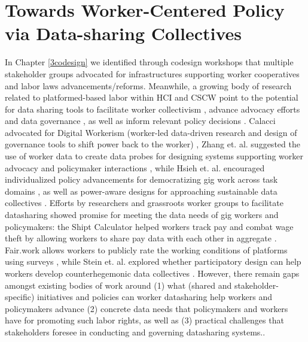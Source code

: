 \chapter{Towards Worker-Centered Policy via Data-sharing Collectives} \label{support}
In Chapter \ref{3codesign} we identified through codesign workshops that multiple stakeholder groups advocated for infrastructures supporting worker cooperatives and labor laws advancements/reforms. 
Meanwhile, a growing body of research related to platformed-based labor within HCI and CSCW point to the potential for data sharing tools to facilitate worker collectivism \cite{end, workshop, chiworkli, uuapp}, advance advocacy efforts \cite{raorideshare, leverage2022gig} and data governance \cite{calacci2023access, zhang24demystifying}, as well as inform relevant policy decisions \cite{zhang2023stakeholder}. 
Calacci advocated for Digital Workerism (worker-led data-driven research and design of governance tools to shift power back to the worker) \cite{end}, Zhang et. al. suggested the use of worker data to create data probes for designing systems supporting worker advocacy \cite{zhang2023stakeholder} and policymaker interactions \cite{policy_probes}, while Hsieh et. al. encouraged individualized policy advancements for democratizing gig work {across task domains} \cite{individualized}{, as well as power-aware designs for approaching sustainable data collectives \cite{workshop}}. 
Efforts by researchers and grassroots worker groups to facilitate datasharing {showed promise} for meeting the data needs of gig workers and policymakers: the Shipt Calculator helped workers track pay and combat wage theft by allowing workers to share pay data with each other in aggregate \cite{6B4U}. Fair.work allows workers to publicly rate the working conditions of platforms using surveys \cite{GgXq}, while Stein et. al. explored whether participatory design can help workers develop counterhegemonic data collectives \cite{uuapp}. 
However, {there remain gaps amongst existing bodies of work around (1) what (shared and stakeholder-specific) initiatives and policies can worker datasharing help workers and policymakers advance (2)} concrete data needs  that policymakers and workers have for {promoting such labor rights, as well as (3) practical challenges that stakeholders foresee in conducting and governing datasharing systems.}. 

